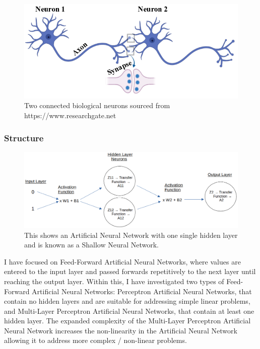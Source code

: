 \documentclass[./project-report/src/latex/project-report.tex]{subfiles}
\begin{document}
\begin{figure}[h!]
\centering
\includegraphics[width=1\textwidth]{./project-report/src/images/connected-neurons.png}
\caption{Two connected biological neurons sourced from https://www.researchgate.net}
\end{figure}

\vspace{5mm}

\subsubsection{Structure}

\begin{figure}[h!]
\centering
\includegraphics[width=1\textwidth]{./project-report/src/images/shallow-ann-diagram.png}
\caption{This shows an Artificial Neural Network with one single hidden layer and is known as a Shallow Neural Network.}
\end{figure}

I have focused on Feed-Forward Artificial Neural Networks, where values are entered to the input layer and passed forwards repetitively to the next layer until 
reaching the output layer. Within this, I have investigated two types of Feed-Forward Artificial Neural Networks: Perceptron Artificial Neural Networks, that contain no 
hidden layers and are suitable for addressing simple linear problems, and Multi-Layer Perceptron Artificial Neural Networks, that contain at least one hidden layer. 
The expanded complexity of the Multi-Layer Perceptron Artificial Neural Network increases the non-linearity in the Artificial Neural Network allowing it to address 
more complex / non-linear problems.
\end{document}
